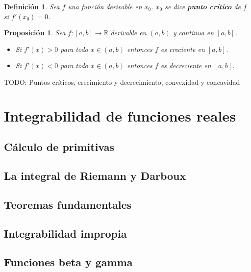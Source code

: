 \documentclass{article}
\newtheorem{prop}{Proposición}
\newtheorem{define}{Definición}
\newcommand{\reales}{\mathbb{R}}
\begin{document}
\begin{define}
	Sea $f$ una función derivable en $x_0$. $x_0$ se dice \textbf{punto crítico} de $f$ si $f'(x_0)=0$.
\end{define}

\begin{prop}
	Sea $f: [a, b] \rightarrow \reales$ derivable en $(a, b)$ y continua en $[a, b]$.
	\begin{itemize}
		\item
		Si $f'(x) > 0$ para todo $x \in (a, b)$ entonces $f$ es creciente en $[a, b]$.
		
		\item
		Si $f'(x) < 0$ para todo $x \in (a, b)$ entonces $f$ es decreciente en $[a, b]$.
	\end{itemize}
\end{prop}

TODO: Puntos críticos, crecimiento y decrecimiento, convexidad y concavidad










\newpage
\section{Integrabilidad de funciones reales}

\subsection{Cálculo de primitivas}

\subsection{La integral de Riemann y Darboux}

\subsection{Teoremas fundamentales}

\subsection{Integrabilidad impropia}

\subsection{Funciones beta y gamma}
\end{document}
